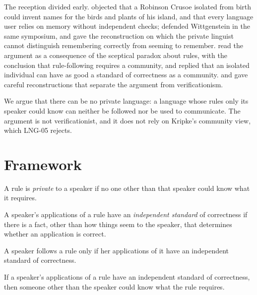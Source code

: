 \documentclass{situationist-preprint}
\begin{document}
The reception divided early. \citet{Ayer1954} objected that a Robinson Crusoe isolated from birth could invent names for the birds and plants of his island, and that every language user relies on memory without independent checks; \citet{Rhees1954} defended Wittgenstein in the same symposium, and \citet{Malcolm1954} gave the reconstruction on which the private linguist cannot distinguish remembering correctly from seeming to remember. \citet{Kripke1982} read the argument as a consequence of the sceptical paradox about rules, with the conclusion that rule-following requires a community, and \citet{Blackburn1984} replied that an isolated individual can have as good a standard of correctness as a community. \citet{Fogelin1976} and \citet{Kenny1973} gave careful reconstructions that separate the argument from verificationism.

We argue that there can be no private language: a language whose rules only its speaker could know can neither be followed nor be used to communicate. The argument is not verificationist, and it does not rely on Kripke's community view, which LNG-05 rejects.

\section{Framework}

\begin{definition}\label{d:private}
A rule is \emph{private} to a speaker if no one other than that speaker could know what it requires.
\end{definition}

\begin{definition}\label{d:standard}
A speaker's applications of a rule have an \emph{independent standard} of correctness if there is a fact, other than how things seem to the speaker, that determines whether an application is correct.
\end{definition}

\begin{assumption}[Standard]\label{a:standard}
A speaker follows a rule only if her applications of it have an independent standard of correctness.
\end{assumption}

\begin{assumption}[Shareability]\label{a:share}
If a speaker's applications of a rule have an independent standard of correctness, then someone other than the speaker could know what the rule requires.
\end{assumption}
\end{document}
